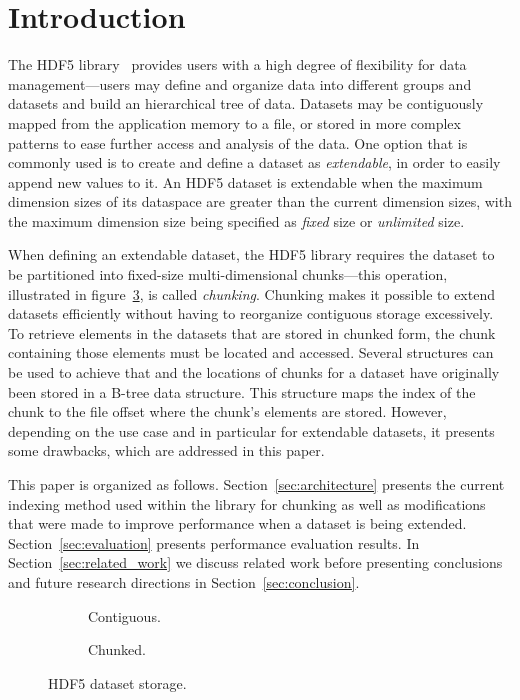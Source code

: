 
\section{Introduction}

The HDF5 library~\cite{Folk2011}\cite{Folk1999} provides users with a high degree of flexibility for data
management---users may define and organize data into different groups and
datasets and build an hierarchical tree of data. Datasets may be contiguously 
mapped from the application memory to a file, or stored in more complex 
patterns to ease further access and analysis of the data. One option that
is commonly used is to create and define a dataset as \textit{extendable},
in order to easily append new values to it.
An HDF5 dataset is extendable when the maximum dimension sizes of its 
dataspace are greater than the current dimension sizes, with the maximum dimension 
size being specified as \textit{fixed} size or \textit{unlimited} size.

When defining an extendable dataset, the HDF5 library requires the dataset
to be partitioned into fixed-size multi-dimensional chunks---this operation, 
illustrated in figure~\ref{fig:hdf5_dataset}, is called \textit{chunking}.
Chunking makes it possible to extend datasets efficiently without having to
reorganize contiguous storage excessively. To retrieve elements in the
datasets that are stored in chunked form, the chunk containing those
elements must be located and accessed. Several structures can be used
to achieve that and the locations of chunks for a dataset have originally 
been stored in a B-tree data structure. This structure maps the index of the chunk to 
the file offset where the chunk's elements are stored. However, depending
on the use case and in particular for extendable datasets, it presents some
drawbacks, which are addressed in this paper.

This paper is organized as follows. 
Section~\ref{sec:architecture} presents the 
current indexing method used within the library for chunking as well as 
modifications that were made to improve performance when a dataset is 
being extended. Section~\ref{sec:evaluation} presents performance evaluation 
results. In Section~\ref{sec:related_work} we discuss related work before
presenting conclusions and future research directions in Section~\ref{sec:conclusion}.

\begin{figure}
\begin{subfigure}[b]{.49\linewidth}
\centering

\caption{Contiguous.}
\label{fig:contiguous}
\end{subfigure}%
\hfill
\begin{subfigure}[b]{.49\linewidth}
\centering

\vspace{-15pt}
\caption{Chunked.}
\label{fig:chunked}
\end{subfigure}
\caption{HDF5 dataset storage.}
\label{fig:hdf5_dataset}
\end{figure}

